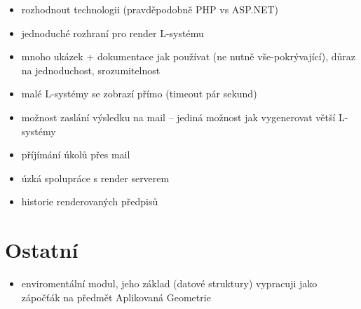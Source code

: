 \documentclass[12pt, a4paper]{article}
\begin{document}
\begin{itemize}
	\item rozhodnout technologii (pravděpodobně PHP vs ASP.NET)
	
	\item jednoduché rozhraní pro render L-systému
	
	\item mnoho ukázek + dokumentace jak používat (ne nutně vše-pokrývající), důraz na jednoduchost, srozumitelnost
	
	\item malé L-systémy se zobrazí přímo (timeout pár sekund)
	
	\item možnost zaslání výsledku na mail -- jediná možnost jak vygenerovat větší L-systémy
	
	\item příjímání úkolů přes mail
	
	\item úzká spolupráce s render serverem
	
	\item historie renderovaných předpisů
\end{itemize}


\section{Ostatní}
\begin{itemize}
	\item enviromentální modul, jeho základ (datové struktury) vypracuji jako zápočťák na předmět Aplikovaná Geometrie
\end{itemize}
\end{document}
